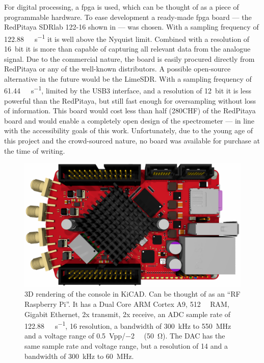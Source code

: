 For digital processing, a \acrfull{fpga} is used, which can be thought of as a piece of programmable hardware. To ease development a ready-made \acrshort{fpga} board --- the RedPitaya SDRlab 122-16 shown in  --- was chosen. With a sampling frequency of \qty{122.88}{\mega\sample\per\second} it is well above the Nyquist limit. Combined with a resolution of \qty{16}{bit} it is more than capable of capturing all relevant data from the analogue signal. Due to the commercial nature, the board is easily procured directly from RedPitaya or any of the well-known distributors. A possible open-source alternative in the future would be the LimeSDR. With a sampling frequency of \qty{61.44}{\mega\sample\per\second}, limited by the USB3 interface, and a resolution of \qty{12}{bit} it is less powerful than the RedPitaya, but still fast enough for oversampling without loss of information. This board would cost less than half (\approx 280CHF) of the RedPitaya board and would enable a completely open design of the spectrometer --- in line with the accessibility goals of this work. Unfortunately, due to the young age of this project and the crowd-sourced nature, no board was available for purchase at the time of writing.

\begin{figure}[hbt]
    \centering
    \includegraphics{images/rp122-16.png}
    \caption{ 3D rendering of the console in KiCAD. Can be thought of as an \enquote{RF Raspberry Pi}. It has a Dual Core ARM Cortex A9, \qty{512}{\mega\byte} RAM, Gigabit Ethernet, 2x transmit, 2x receive, an ADC sample rate of \qty{122.88}{\mega\sample\per\second}, \qty{16}{\bit} resolution, a bandwidth of \qty{300}{\kilo\hertz} to \qty{550}{\mega\hertz} and a voltage range of \qty{0.5}{Vpp}/\qty{-2}{\deci\belm} (\qty{50}{\ohm}). The DAC has the same sample rate and voltage range, but a resolution of \qty{14}{\bit} and a bandwidth of \qty{300}{\kilo\hertz} to \qty{60}{\mega\hertz}.}
\end{figure}


